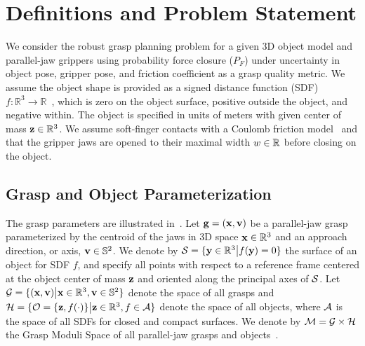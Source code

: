 \section{Definitions and Problem Statement}

We consider the robust grasp planning problem for a given 3D object model and parallel-jaw grippers using probability force closure ($P_F$)  under uncertainty in object pose, gripper pose, and friction coefficient as a grasp quality metric.
We assume the object shape is provided as a signed distance function (SDF) $f: \mathbb{R}^3 \rightarrow \mathbb{R}$~\cite{mahler2015gp}, which is zero on the object surface, positive outside the object, and negative within. 
The object is specified in units of meters with given center of mass $\mathbf{z} \in \mathbb{R}^3$.
We assume soft-finger contacts with a Coulomb friction model~\cite{zheng2005} and that the gripper jaws are opened to their maximal width $w \in\mathbb{R}$ before closing on the object.

\subsection{Grasp and Object Parameterization}
The grasp parameters are illustrated in~.
Let $\mathbf{g} = (\mathbf{x}, \mathbf{v})$ be a parallel-jaw grasp parameterized by the centroid of the jaws in 3D space $\mathbf{x} \in \mathbb{R}^3$ and an approach direction, or axis, $\mathbf{v} \in \mathbb{S}^2$.
We denote by $\mathcal{S} = \{\mathbf{y} \in \mathbb{R}^3 \big| f(\mathbf{y}) = 0\}$ the surface of an object for SDF $f$, and specify all points with respect to a reference frame centered at the object center of mass $\mathbf{z}$ and oriented along the principal axes of $\mathcal{S}$.
Let $\mathcal{G} = \{ (\mathbf{x}, \mathbf{v}) \big| \mathbf{x} \in \mathbb{R}^3, \mathbf{v} \in \mathbb{S}^2\}$ denote the space of all grasps and $\mathcal{H} = \{ \mathcal{O} = \{\mathbf{z}, f(\cdot)\} \big|  \mathbf{z} \in \mathbb{R}^3, f \in \mathcal{A}\}$ denote the space of all objects, where $\mathcal{A}$ is the space of all SDFs for closed and compact surfaces.
We denote by $\mathcal{M} = \mathcal{G} \times \mathcal{H}$ the Grasp Moduli Space of all parallel-jaw grasps and objects~\cite{pokorny2013grasp}.

